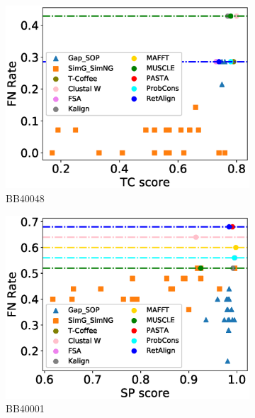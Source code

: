 \begin{figure}[!htbp]
\begin{adjustwidth}{-1.5cm}{-1cm}
\begin{subfigure}{0.22\textwidth}
			\includegraphics[width=\columnwidth]{Figure/summary/precomputedInit/Balibase/BB40048_fnrate_vs_tc_2}
			\caption{BB40048}
		\end{subfigure}
		\begin{subfigure}{0.22\textwidth}
			\includegraphics[width=\columnwidth]{Figure/summary/precomputedInit/Balibase/BB40001_fnrate_vs_sp_2}
			\caption{BB40001}
		\end{subfigure}	
		\begin{subfigure}{0.22\textwidth}

\end{subfigure}
\end{adjustwidth}
\end{figure}
